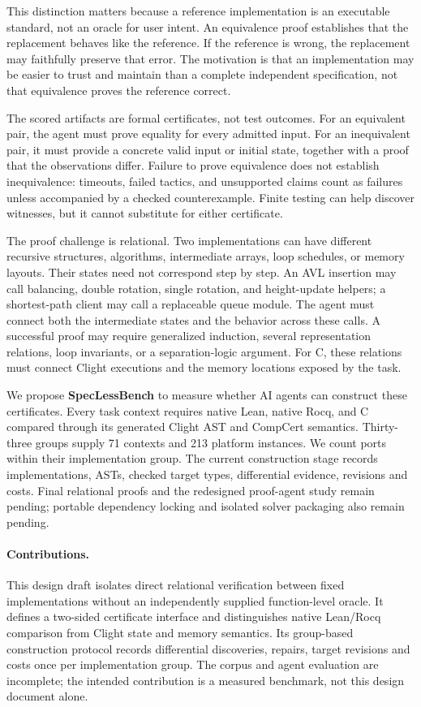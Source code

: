 \documentclass{article}
\begin{document}
This distinction matters because a reference implementation is an executable standard, not an oracle for user intent. An equivalence proof establishes that the replacement behaves like the reference. If the reference is wrong, the replacement may faithfully preserve that error. The motivation is that an implementation may be easier to trust and maintain than a complete independent specification, not that equivalence proves the reference correct.

The scored artifacts are formal certificates, not test outcomes. For an equivalent pair, the agent must prove equality for every admitted input. For an inequivalent pair, it must provide a concrete valid input or initial state, together with a proof that the observations differ. Failure to prove equivalence does not establish inequivalence: timeouts, failed tactics, and unsupported claims count as failures unless accompanied by a checked counterexample. Finite testing can help discover witnesses, but it cannot substitute for either certificate.

The proof challenge is relational. Two implementations can have different recursive structures, algorithms, intermediate arrays, loop schedules, or memory layouts. Their states need not correspond step by step. An AVL insertion may call balancing, double rotation, single rotation, and height-update helpers; a shortest-path client may call a replaceable queue module. The agent must connect both the intermediate states and the behavior across these calls. A successful proof may require generalized induction, several representation relations, loop invariants, or a separation-logic argument. For C, these relations must connect Clight executions and the memory locations exposed by the task.

We propose \textbf{SpecLessBench} to measure whether AI agents can construct these certificates. Every task context requires native Lean, native Rocq, and C compared through its generated Clight AST and CompCert semantics. Thirty-three groups supply 71 contexts and 213 platform instances. We count ports within their implementation group. The current construction stage records implementations, ASTs, checked target types, differential evidence, revisions and costs. Final relational proofs and the redesigned proof-agent study remain pending; portable dependency locking and isolated solver packaging also remain pending.

\paragraph{Contributions.}
This design draft isolates direct relational verification between fixed implementations without an independently supplied function-level oracle. It defines a two-sided certificate interface and distinguishes native Lean/Rocq comparison from Clight state and memory semantics. Its group-based construction protocol records differential discoveries, repairs, target revisions and costs once per implementation group. The corpus and agent evaluation are incomplete; the intended contribution is a measured benchmark, not this design document alone.
\end{document}
